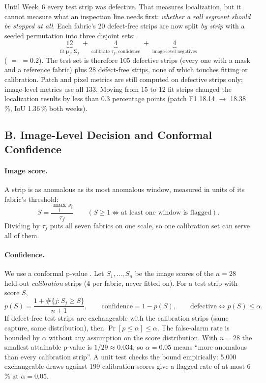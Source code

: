 \documentclass[11pt,a4paper]{article}
\newcommand{\code}[1]{\texttt{\detokenize{#1}}}
\begin{document}
Until Week~6 every test strip was defective. That measures localization, but it cannot measure what an inspection line needs first: \emph{whether a roll segment should be stopped at all}. Each fabric's 20 defect-free strips are now split \emph{by strip} with a seeded permutation into three disjoint sets:
\begin{equation}
\underbrace{12}_{\text{fit }\boldsymbol{\mu}_f,\boldsymbol{\Sigma}_f}\;+\;\underbrace{4}_{\text{calibrate }\tau_f\text{, confidence}}\;+\;\underbrace{4}_{\text{image-level negatives}}
\label{eq:split}
\end{equation}
(\code{calibration_fraction} $=$ \code{test_fraction} $=0.2$). The test set is therefore 105 defective strips (every one with a mask and a reference fabric) plus 28 defect-free strips, none of which touches fitting or calibration. Patch and pixel metrics are still computed on defective strips only; image-level metrics use all 133. Moving from 15 to 12 fit strips changed the localization results by less than 0.3 percentage points (patch F1 18.14 $\rightarrow$ 18.38\,\%, IoU 1.36\,\% both weeks).

\subsection*{B. Image-Level Decision and Conformal Confidence}

\paragraph{Image score.} A strip is as anomalous as its most anomalous window, measured in units of its fabric's threshold:
\begin{equation}
S=\frac{\max_i s_i}{\tau_f}\qquad(S\ge1\iff\text{at least one window is flagged}).
\label{eq:imgscore}
\end{equation}
Dividing by $\tau_f$ puts all seven fabrics on one scale, so one calibration set can serve all of them.

\paragraph{Confidence.} We use a conformal p-value \cite{vovk2005,laxhammar2015}. Let $S_1,\dots,S_n$ be the image scores of the $n=28$ held-out \emph{calibration} strips (4 per fabric, never fitted on). For a test strip with score $S$,
\begin{equation}
p(S)=\frac{1+\#\{j: S_j\ge S\}}{n+1},\qquad \text{confidence}=1-p(S),\qquad \text{defective}\iff p(S)\le\alpha .
\label{eq:conformal}
\end{equation}
If defect-free test strips are exchangeable with the calibration strips (same capture, same distribution), then $\Pr[p\le\alpha]\le\alpha$. The false-alarm rate is bounded by $\alpha$ without any assumption on the score distribution. With $n=28$ the smallest attainable p-value is $1/29\approx0.034$, so $\alpha=0.05$ means ``more anomalous than every calibration strip''. A unit test checks the bound empirically: 5{,}000 exchangeable draws against 199 calibration scores give a flagged rate of at most 6\,\% at $\alpha=0.05$.
\end{document}
